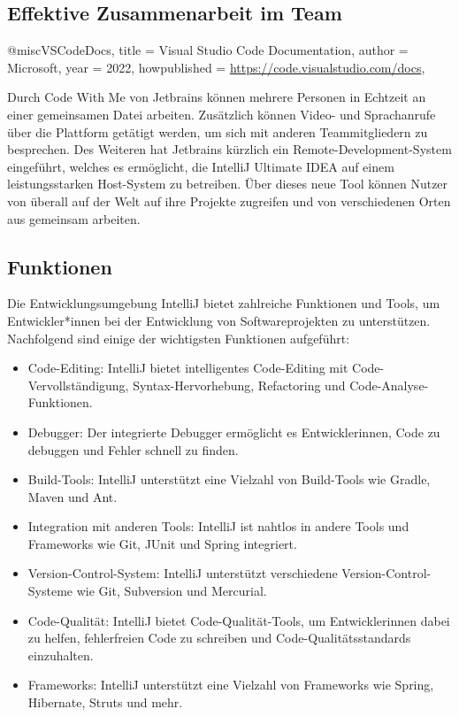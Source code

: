 \subsection{Effektive Zusammenarbeit im Team}@misc{VSCodeDocs,
title = {{Visual Studio Code Documentation}},
author = {{Microsoft}},
year = {2022},
howpublished = {\url{https://code.visualstudio.com/docs}},
}

Durch Code With Me von Jetbrains können mehrere Personen in Echtzeit an einer gemeinsamen Datei arbeiten. Zusätzlich können Video- und Sprachanrufe über die Plattform getätigt werden, um sich mit anderen Teammitgliedern zu besprechen. Des Weiteren hat Jetbrains kürzlich ein Remote-Development-System eingeführt, welches es ermöglicht, die IntelliJ Ultimate IDEA auf einem leistungsstarken Host-System zu betreiben. Über dieses neue Tool können Nutzer von überall auf der Welt auf ihre Projekte zugreifen und von verschiedenen Orten aus gemeinsam arbeiten.

\subsection{Funktionen}

Die Entwicklungsumgebung IntelliJ bietet zahlreiche Funktionen und Tools, um Entwickler*innen bei der Entwicklung von Softwareprojekten zu unterstützen. Nachfolgend sind einige der wichtigsten Funktionen aufgeführt:

\begin{itemize}
\item Code-Editing: IntelliJ bietet intelligentes Code-Editing mit Code-Vervollständigung, Syntax-Hervorhebung, Refactoring und Code-Analyse-Funktionen.
\item Debugger: Der integrierte Debugger ermöglicht es Entwicklerinnen, Code zu debuggen und Fehler schnell zu finden.
\item Build-Tools: IntelliJ unterstützt eine Vielzahl von Build-Tools wie Gradle, Maven und Ant.
\item Integration mit anderen Tools: IntelliJ ist nahtlos in andere Tools und Frameworks wie Git, JUnit und Spring integriert.
\item Version-Control-System: IntelliJ unterstützt verschiedene Version-Control-Systeme wie Git, Subversion und Mercurial.
\item Code-Qualität: IntelliJ bietet Code-Qualität-Tools, um Entwicklerinnen dabei zu helfen, fehlerfreien Code zu schreiben und Code-Qualitätsstandards einzuhalten.
\item Frameworks: IntelliJ unterstützt eine Vielzahl von Frameworks wie Spring, Hibernate, Struts und mehr.
\end{itemize}
\newpage

